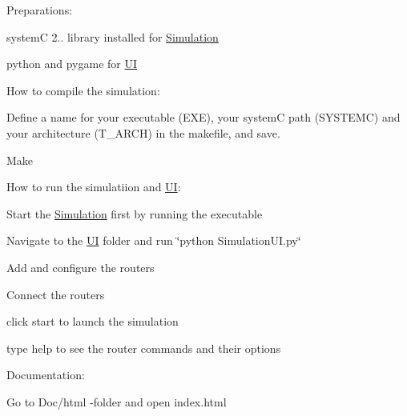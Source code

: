 Preparations\-:


\begin{DoxyEnumerate}
\item system\-C 2.. library installed for \hyperlink{classSimulation}{Simulation}
\item python and pygame for \hyperlink{namespaceUI}{U\-I}
\end{DoxyEnumerate}



 How to compile the simulation\-:


\begin{DoxyEnumerate}
\item Define a name for your executable (E\-X\-E), your system\-C path (S\-Y\-S\-T\-E\-M\-C) and your architecture (T\-\_\-\-A\-R\-C\-H) in the makefile, and save.
\item Make
\end{DoxyEnumerate}



 How to run the simulatiion and \hyperlink{namespaceUI}{U\-I}\-:


\begin{DoxyEnumerate}
\item Start the \hyperlink{classSimulation}{Simulation} first by running the executable
\item Navigate to the \hyperlink{namespaceUI}{U\-I} folder and run \char`\"{}python Simulation\-U\-I.\-py\char`\"{}
\item Add and configure the routers
\item Connect the routers
\item click start to launch the simulation
\item type help to see the router commands and their options
\end{DoxyEnumerate}



 Documentation\-:


\begin{DoxyEnumerate}
\item Go to Doc/html -\/folder and open index.\-html 
\end{DoxyEnumerate}